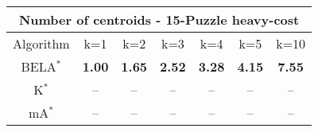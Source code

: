 \begin{tabular}{c|cccccc}\toprule
\multicolumn{7}{c}{Number of centroids - 15-Puzzle heavy-cost}\\ \midrule
Algorithm & k=1 & k=2 & k=3 & k=4 & k=5 & k=10 \\ \midrule
BELA$^*$ & \textbf{1.00} & \textbf{1.65} & \textbf{2.52} & \textbf{3.28} & \textbf{4.15} & \textbf{7.55} \\
K$^*$ & -- & -- & -- & -- & -- & -- \\
mA$^*$ & -- & -- & -- & -- & -- & -- \\ \bottomrule 
\end{tabular}
